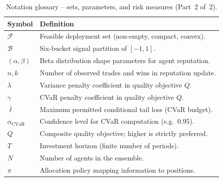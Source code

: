\documentclass[12pt,openany]{book}
\numberwithin{equation}{chapter}
\theoremstyle{plain}
\theoremstyle{definition}
\theoremstyle{remark}
\numberwithin{equation}{chapter}
\theoremstyle{plain}
\begin{document}
\begin{table}[H]
\centering
\caption{Notation glossary -- sets, parameters, and risk measures (Part~2 of~2).}
\label{tab:notation-2}
\small
\begin{tabularx}{\linewidth}{@{} l X @{}}
\toprule
\textbf{Symbol} & \textbf{Definition} \\
\midrule
$\mathcal{F}$   & Feasible deployment set (non-empty, compact, convex). \\[2pt]
$\mathcal{B}$   & Six-bucket signal partition of $[-1,1]$. \\[2pt]
$(\alpha,\beta)$ & Beta distribution shape parameters for agent reputation. \\[2pt]
$n,k$           & Number of observed trades and wins in reputation update. \\[2pt]
$\lambda$       & Variance penalty coefficient in quality objective $Q$. \\[2pt]
$\gamma$        & CVaR penalty coefficient in quality objective $Q$. \\[2pt]
$\bar{\ell}$    & Maximum permitted conditional tail loss (CVaR budget). \\[2pt]
$\alpha_{\mathrm{CVaR}}$ & Confidence level for CVaR computation (e.g.\ $0.95$). \\[2pt]
$Q$             & Composite quality objective; higher is strictly preferred. \\[2pt]
$T$             & Investment horizon (finite number of periods). \\[2pt]
$N$             & Number of agents in the ensemble. \\[2pt]
$\pi$           & Allocation policy mapping information to positions. \\
\bottomrule
\end{tabularx}
\end{table}
\end{document}
